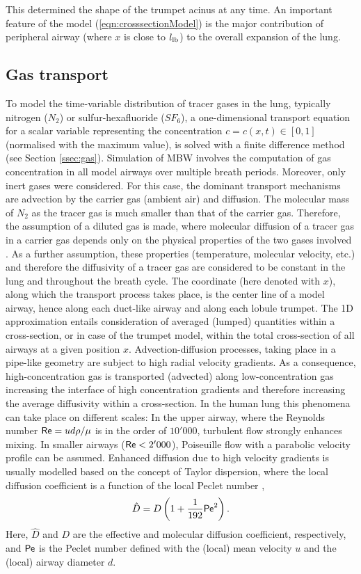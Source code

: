 This determined the shape of the trumpet acinus at any time.
An important feature of the model (\ref{eqn:crosssectionModel}) is the major contribution of peripheral airway (where $x$ is close to $l_{\mathrm{lb}}$) to the overall expansion of the lung.


\subsection{Gas transport} \label{ssec:lobules}
To model the time-variable distribution of tracer gases in the lung, typically nitrogen ($N_2$) or sulfur-hexafluoride ($SF_6$), a one-dimensional transport equation for a scalar variable representing the concentration $c = c(x,t)\in[0,1]$ (normalised with the maximum value), is solved with a finite difference method (see Section \ref{ssec:gas}).
Simulation of MBW involves the computation of gas concentration in all model airways over multiple breath periods.
Moreover, only inert gases were considered.
For this case, the dominant transport mechanisms are advection by the carrier gas (ambient air) and diffusion.
The molecular mass of $N_2$ as the tracer gas is much smaller than that of the carrier gas.
Therefore, the assumption of a diluted gas is made, where molecular diffusion of a tracer gas in a carrier gas depends only on the physical properties of the two gases involved \cite{Cussler2009}.
As a further assumption, these properties (temperature, molecular velocity, etc.) and therefore the diffusivity of a tracer gas are considered to be constant in the lung and throughout the breath cycle.
The coordinate (here denoted with $x$), along which the transport process takes place, is the center line of a model airway, hence along each duct-like airway and along each lobule trumpet.
The 1D approximation entails consideration of averaged (lumped) quantities within a cross-section, or in case of the trumpet model, within the total cross-section of all airways at a given position $x$.
Advection-diffusion processes, taking place in a pipe-like geometry are subject to high radial velocity gradients.
As a consequence, high-concentration gas is transported (advected) along low-concentration gas increasing the interface of high concentration gradients and therefore increasing the average diffusivity within a cross-section.
In the human lung this phenomena can take place on different scales: In the upper airway, where the Reynolds number $\mathsf{Re} = u d \rho/\mu$ is in the order of $10'000$, turbulent flow strongly enhances mixing.
In smaller airways ($\mathsf{Re} < 2'000$), Poiseuille flow with a parabolic velocity profile can be assumed.
Enhanced diffusion due to high velocity gradients is usually modelled based on the concept of Taylor dispersion, where the local diffusion coefficient is a function of the local Peclet number \citet{Cussler209},
\begin{equation}
\hat{D} = D\left(1 + \frac{1}{192}\mathsf{Pe}^2\right) \text{.}
\end{equation}
Here, $\hat{D}$ and $D$ are the effective and molecular diffusion coefficient, respectively, and $\mathsf{Pe}$ is the Peclet number defined with the (local) mean velocity $u$ and the (local) airway diameter $d$.

